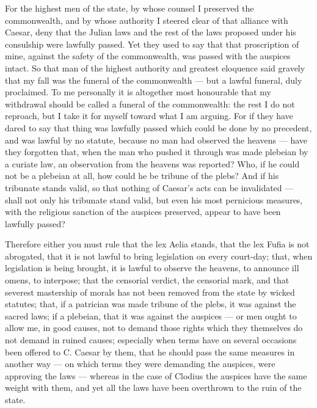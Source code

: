  For the highest men of the state, by whose counsel I preserved the commonwealth, and by whose authority I steered clear of that alliance with Caesar, deny that the Julian laws and the rest of the laws proposed under his consulship were lawfully passed. Yet they used to say that that proscription of mine, against the safety of the commonwealth, was passed with the auspices intact. So that man of the highest authority and greatest eloquence said gravely that my fall was the funeral of the commonwealth --- but a lawful funeral, duly proclaimed. To me personally it is altogether most honourable that my withdrawal should be called a funeral of the commonwealth: the rest I do not reproach, but I take it for myself toward what I am arguing. For if they have dared to say that thing was lawfully passed which could be done by no precedent, and was lawful by no statute, because no man had observed the heavens --- have they forgotten that, when the man who pushed it through was made plebeian by a curiate law, an observation from the heavens was reported? Who, if he could not be a plebeian at all, how could he be tribune of the plebs? And if his tribunate stands valid, so that nothing of Caesar's acts can be invalidated --- shall not only his tribunate stand valid, but even his most pernicious measures, with the religious sanction of the auspices preserved, appear to have been lawfully passed?

 Therefore either you must rule that the lex Aelia stands, that the lex Fufia is not abrogated, that it is not lawful to bring legislation on every court-day; that, when legislation is being brought, it is lawful to observe the heavens, to announce ill omens, to interpose; that the censorial verdict, the censorial mark, and that severest mastership of morals has not been removed from the state by wicked statutes; that, if a patrician was made tribune of the plebs, it was against the sacred laws; if a plebeian, that it was against the auspices --- or men ought to allow me, in good causes, not to demand those rights which they themselves do not demand in ruined causes; especially when terms have on several occasions been offered to C. Caesar by them, that he should pass the same measures in another way --- on which terms they were demanding the auspices, were approving the laws --- whereas in the case of Clodius the auspices have the same weight with them, and yet all the laws have been overthrown to the ruin of the state.

